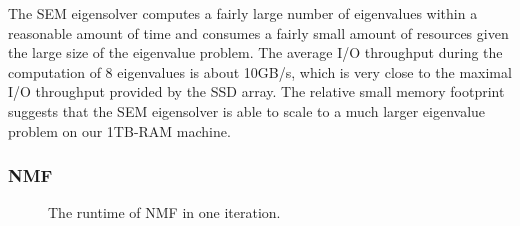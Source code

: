 The SEM eigensolver computes a fairly large number of eigenvalues within a reasonable
amount of time and consumes a fairly small amount of resources given the large
size of the eigenvalue problem.
The average I/O throughput during the computation of 8 eigenvalues is about
10GB/s, which is very close to the maximal I/O throughput provided by
the SSD array. The relative small memory footprint suggests that the SEM
eigensolver is able to scale to a much larger eigenvalue problem on our
1TB-RAM machine.

\subsubsection{NMF}

\begin{figure}
	\begin{center}
		\footnotesize
		
		\caption{The runtime of NMF in one iteration.}
		\label{perf:NMF}
	\end{center}
\end{figure}
